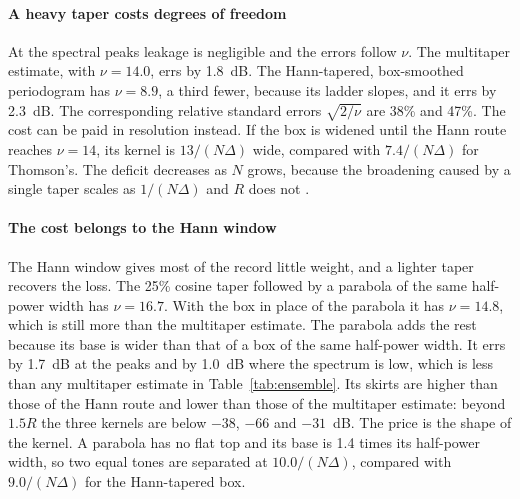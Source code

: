 \documentclass[10pt,twocolumn]{article}
\begin{document}
\paragraph{A heavy taper costs degrees of freedom} At the spectral peaks leakage is negligible and the errors follow $\nu$. The multitaper estimate, with $\nu=14.0$, errs by 1.8~dB. The Hann-tapered, box-smoothed periodogram has $\nu=8.9$, a third fewer, because its ladder slopes, and it errs by 2.3~dB. The corresponding relative standard errors $\sqrt{2/\nu}$ are 38\% and 47\%. The cost can be paid in resolution instead. If the box is widened until the Hann route reaches $\nu=14$, its kernel is $13/(N\Delta)$ wide, compared with $7.4/(N\Delta)$ for Thomson's. The deficit decreases as $N$ grows, because the broadening caused by a single taper scales as $1/(N\Delta)$ and $R$ does not \cite{riedel1994}.

\paragraph{The cost belongs to the Hann window} The Hann window gives most of the record little weight, and a lighter taper recovers the loss. The 25\% cosine taper followed by a parabola of the same half-power width has $\nu=16.7$. With the box in place of the parabola it has $\nu=14.8$, which is still more than the multitaper estimate. The parabola adds the rest because its base is wider than that of a box of the same half-power width. It errs by 1.7~dB at the peaks and by 1.0~dB where the spectrum is low, which is less than any multitaper estimate in Table~\ref{tab:ensemble}. Its skirts are higher than those of the Hann route and lower than those of the multitaper estimate: beyond $1.5R$ the three kernels are below $-38$, $-66$ and $-31$~dB. The price is the shape of the kernel. A parabola has no flat top and its base is 1.4 times its half-power width, so two equal tones are separated at $10.0/(N\Delta)$, compared with $9.0/(N\Delta)$ for the Hann-tapered box.
\end{document}
